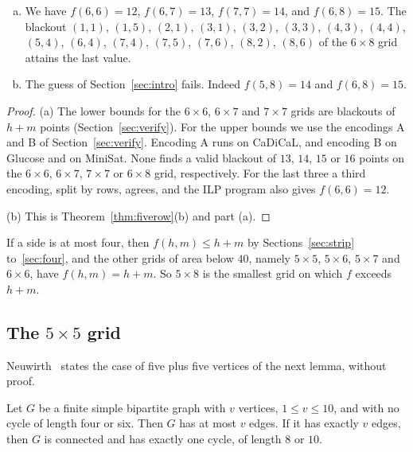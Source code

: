 \begin{theorem}\label{thm:refute}
\begin{enumerate}[(a)]
\item We have $f(6,6)=12$, $f(6,7)=13$, $f(7,7)=14$, and $f(6,8)=15$. The blackout $(1,1)$,
$(1,5)$, $(2,1)$, $(3,1)$, $(3,2)$, $(3,3)$, $(4,3)$, $(4,4)$, $(5,4)$, $(6,4)$, $(7,4)$,
$(7,5)$, $(7,6)$, $(8,2)$, $(8,6)$ of the $6\times8$ grid attains the last value.
\item The guess of Section~\ref{sec:intro} fails. Indeed $f(5,8)=14$ and $f(6,8)=15$.
\end{enumerate}
\end{theorem}

\begin{proof}
(a) The lower bounds for the $6\times6$, $6\times7$ and $7\times7$ grids are blackouts of
$h+m$ points (Section~\ref{sec:verify}). For the upper bounds we use the encodings A and B of
Section~\ref{sec:verify}. Encoding A runs on CaDiCaL, and encoding B on Glucose and on MiniSat.
None finds a valid blackout of $13$, $14$, $15$ or $16$ points on the $6\times6$, $6\times7$,
$7\times7$ or $6\times8$ grid, respectively. For the last three a third encoding, split by
rows, agrees, and the ILP program also gives $f(6,6)=12$.

(b) This is Theorem~\ref{thm:fiverow}(b) and part (a).
\end{proof}

If a side is at most four, then $f(h,m)\le h+m$ by Sections~\ref{sec:strip}
to~\ref{sec:four}, and the other grids of area below $40$, namely $5\times5$, $5\times6$,
$5\times7$ and $6\times6$, have $f(h,m)=h+m$. So $5\times8$ is the smallest grid on which $f$
exceeds $h+m$.

\subsection{The \texorpdfstring{$5\times5$}{5 x 5} grid}

Neuwirth~\cite[Remark~18]{neuwirth2001} states the case of five plus five vertices of the
next lemma, without proof.

\begin{lemma}\label{lem:tenvertices}
Let $G$ be a finite simple bipartite graph with $v$ vertices, $1\le v\le10$, and with no cycle
of length four or six. Then $G$ has at most $v$ edges. If it has exactly $v$ edges, then $G$ is
connected and has exactly one cycle, of length $8$ or $10$.
\end{lemma}

